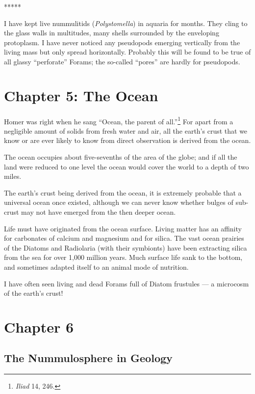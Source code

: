 \documentclass[a4paper, 12pt, oneside]{article}
\begin{document}
\centerline{*\hspace{15mm}*\hspace{15mm}*\hspace{15mm}*\hspace{15mm}*}
\bigskip

I have kept live nummulitids (\emph{Polystomella}) in aquaria for months. They cling to the glass walls in multitudes, many shells surrounded by the enveloping protoplasm. I have never noticed any pseudopods emerging vertically from the living mass but only spread horizontally. Probably this will be found to be true of all glassy ``perforate'' Forams; the so-called ``pores'' are hardly for pseudopods.
\clearpage
\section{Chapter 5: The Ocean}
\paragraph{}
Homer was right when he sang ``Ocean, the parent of all.''\footnote{\emph{Iliad} 14, 246.} For apart from a negligible amount of solids from fresh water and air, all the earth's crust that we know or are ever likely to know from direct observation is derived from the ocean.

The ocean occupies about five-sevenths of the area of the globe; and if all the land were reduced to one level the ocean would cover the world to a depth of two miles.

The earth's crust being derived from the ocean, it is extremely probable that a universal ocean once existed, although we can never know whether bulges of sub-crust may not have emerged from the then deeper ocean.

Life must have originated from the ocean surface. Living matter has an affinity for carbonates of calcium and magnesium and for silica. The vast ocean prairies of the Diatoms and Radiolaria (with their symbionts) have been extracting silica from the sea for over 1,000 million years. Much surface life sank to the bottom, and sometimes adapted itself to an animal mode of nutrition.

I have often seen living and dead Forams full of Diatom frustules --- a microcosm of the earth's crust!
\clearpage
\section{Chapter 6}
\subsection{The Nummulosphere in Geology}
\end{document}
